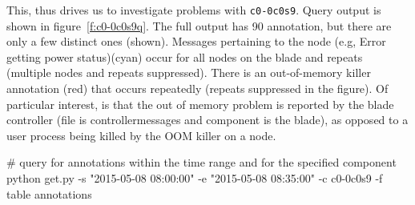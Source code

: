 This, thus drives us to investigate problems with \texttt{c0-0c0s9}. Query output is shown in figure~\ref{f:c0-0c0s9q}. The full output has 90 annotation, but there
are only a few distinct ones (shown).  Messages pertaining to the node (e.g, Error getting power status)(cyan) occur for all nodes on the blade and repeats (multiple nodes and repeats
suppressed). There is an out-of-memory killer annotation (red) that occurs repeatedly (repeats suppressed in the figure). Of particular interest, is that the
out of memory problem is reported by the blade controller (file is controllermessages and component is the blade), as opposed to a user process being killed by
the OOM killer on a node.


\begin{figure*}
\begin{annol}
# query for annotations within the time range and for the specified component
python get.py -s "2015-05-08 08:00:00" -e "2015-05-08 08:35:00" -c c0-0c0s9 -f table annotations


\end{annol}
\end{figure*}
